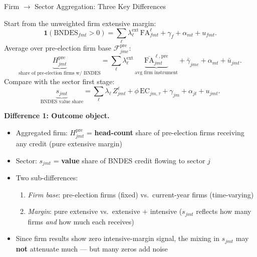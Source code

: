 \documentclass[aspectratio=169,11pt]{beamer}
\newcommand{\FA}{\mathrm{FA}}
\newcommand{\EC}{\mathrm{EC}}
\begin{document}
\begin{frame}[allowframebreaks]{Firm $\to$ Sector Aggregation: Three Key Differences}
\hypertarget{slide:aggregation}{}

Start from the unweighted firm extensive margin:
\vspace{-6pt}
\[
  \mathbf{1}(\text{BNDES}_{fmt} > 0)
  = \sum_{\ell} \lambda^{\text{ext}}_{\ell}\, \FA^{\ell}_{fmt}
  + \gamma_{f} + \alpha_{mt} + u_{fmt}.
\]
\vspace{-6pt}
Average over pre-election firm base $\mathcal{F}^{\mathrm{pre}}_{jme}$:
\vspace{-6pt}
\[
  \underbrace{H^{\mathrm{pre}}_{jmt}}_{\text{share of pre-election firms w/ BNDES}}
  = \sum_{\ell} \lambda^{\text{ext}}_{\ell}\,
  \underbrace{\overline{\FA}^{\ell,\mathrm{pre}}_{jmt}}_{\text{avg firm instrument}}
  + \bar{\gamma}_{jme} + \alpha_{mt} + \bar{u}_{jmt}.
\]
\vspace{-6pt}
Compare with the sector first stage:
\vspace{-6pt}
\[
  \underbrace{s_{jmt}}_{\text{BNDES value share}} = \sum_{\ell} \lambda_{\ell}\, Z^{\ell}_{jmt}
  + \phi\,\EC_{jm,\tau} + \gamma_{jm} + \alpha_{jt} + u_{jmt}.
\]

\framebreak

\textbf{Difference 1: Outcome object.}
\begin{itemize}
    \item Aggregated firm: $H^{\mathrm{pre}}_{jmt}$ = \textbf{head-count} share of pre-election firms receiving any credit (pure extensive margin)
    \item Sector: $s_{jmt}$ = \textbf{value} share of BNDES credit flowing to sector $j$
    \item Two sub-differences:
    \begin{enumerate}
        \item \textit{Firm base}: pre-election firms (fixed) vs.\ current-year firms (time-varying)
        \item \textit{Margin}: pure extensive vs.\ extensive $+$ intensive ($s_{jmt}$ reflects how many firms \emph{and} how much each receives)
    \end{enumerate}
    \item Since firm results show zero intensive-margin signal, the mixing in $s_{jmt}$ may \textbf{not} attenuate much --- but many zeros add noise
\end{itemize}


\end{frame}
\end{document}
